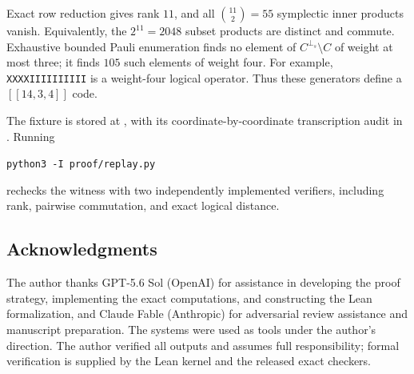 \documentclass[11pt]{amsart}
\theoremstyle{definition}
\theoremstyle{remark}
\newcommand{\perps}{{\perp_s}}
\newcommand{\code}[1]{[\![#1]\!]}
\begin{document}
Exact row reduction gives rank $11$, and all ${11\choose2}=55$ symplectic
inner products vanish.  Equivalently, the $2^{11}=2048$ subset products are
distinct and commute.  Exhaustive bounded Pauli enumeration finds no element
of $C^{\perps}\setminus C$ of weight at most three; it finds $105$ such
elements of weight four.  For example, \texttt{XXXXIIIIIIIIII} is a
weight-four logical operator.  Thus these generators define a
$\code{14,3,4}$ code.

The fixture is stored at , with its
coordinate-by-coordinate transcription audit in
.  Running
\begin{center}
\texttt{python3 -I proof/replay.py}
\end{center}
rechecks the witness with two independently implemented verifiers, including
rank, pairwise commutation, and exact logical distance.

\subsection*{Acknowledgments}
The author thanks GPT-5.6 Sol (OpenAI) for assistance in developing the proof strategy,
implementing the exact computations, and constructing the Lean formalization,
and Claude Fable (Anthropic) for adversarial review assistance and manuscript
preparation. The systems were used as tools under the author's direction. The
author verified all outputs and assumes full responsibility; formal verification
is supplied by the Lean kernel and the released exact checkers.
\end{document}
